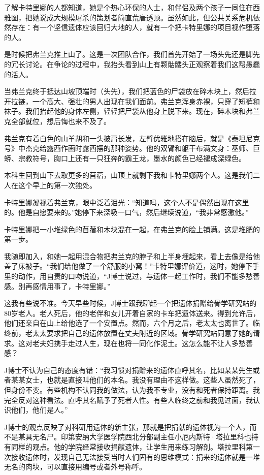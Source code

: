 \documentclass[12pt,oneside]{book}
\begin{document}
\begin{bookref}[frametitle={\cite{好好告别}}]
了解卡特里娜的人都知道，她是个热心环保的人士，和伴侣及两个孩子一同住在西雅图，把她说成大规模屠杀的策划者简直荒唐透顶。虽然如此，但公共关系危机依然存在：有一个坚信遗体应该回归大地的人，就有一个把卡特里娜的项目视作堕落的人。

是时候把弗兰克推上山了。这是一次团队合作，我们首先开始了一场头先还是脚先的冗长讨论。在争论的过程中，我抬头看到山上有颗骷髅头正观察着我们这帮愚蠢的活人。

当弗兰克终于抵达山坡顶端时（头先），我们把蓝色的尸袋放在碎木块上，然后拉开拉链，一个高大、强壮的男人出现在我们面前。弗兰克浑身赤裸，只穿了短裤和袜子。我们抬起他的身体左侧，轻轻把尸袋从他身上脱下来。现在，碎木块和弗兰克全部就位，想后悔也来不及了。

弗兰克有着白色的山羊胡和一头披肩长发，左臂优雅地搭在脑后，就是《泰坦尼克号》中杰克给露西作画时露西摆的那种姿势。他的双臂和躯干布满文身：巫师、巨蟒、宗教符号，胸口上还有一只狂奔的霸王龙，墨水的颜色已经褪成深绿色。

本科生回到山下去取更多的苜蓿，山顶上就剩下我和卡特里娜两个人。这是我们二人在这个早上的第一次独处。

卡特里娜凝视着弗兰克，眼中泛着泪光：“知道吗，这个人不是偶然出现在这里的。他是自愿要来的。”她停下来深吸一口气，然后继续说道，“我非常感激他。”

卡特里娜把一小堆绿色的苜蓿和木块混在一起，在弗兰克的脸上铺满。这是堆肥的第一步。

我随即加入，和她一起用混合物把弗兰克的脖子和上半身埋起来，看上去像是给他盖了床被子。“我们给他做了一个舒服的小窝！”卡特里娜评价道，这时，她停下手里的动作，用自责的口吻说道，“J博士说过，与遗体一起工作时，我们不能多愁善感。别再感情用事了，卡特里娜。”

这我有些说不准。今天早些时候，J博士跟我聊起一个把遗体捐赠给骨学研究站的80岁老人。老人死后，他的老伴和女儿开着自家的卡车把遗体送来。得到允许后，他们还亲自在山上给他选了一个安置点。然而，六个月之后，老太太也离世了。临终前，老太太要求把自己的遗体放置在丈夫附近的区域。骨学研究站同意了她的请求。这对老夫妇携手走过人生，现在也将一同化作泥土。这怎么能不让人多愁善感？

J博士不认为自己的态度有错：“我习惯对捐赠来的遗体直呼其名，比如某某先生或者某某女士，也就是直接叫他们的本名。我没有理由不这样做。这些人虽然死了，但身份不变。有些机构不认同我的做法，认为我不专业，没有和死者保持距离。我完全反对这种看法。直呼其名赋予了死者人性。有些人临终之前和我见过面，我认识他们，他们是人。”

J博士的观点反映了对科研用遗体的新主张，那就是把捐献的遗体视为一个人，而不是某具无名尸。印第安纳大学医学院西北分部副主任小厄内斯特·塔拉里科也持有同样的观点。他的学院经常接收捐献遗体，让学生用来练习解剖。塔拉里科第一次接收遗体时，发现自己无法接受当时人们固有的思维模式：捐来的遗体就是一堆无名的肉块，可以直接用编号或者外号称呼。


\end{bookref}
\end{document}
